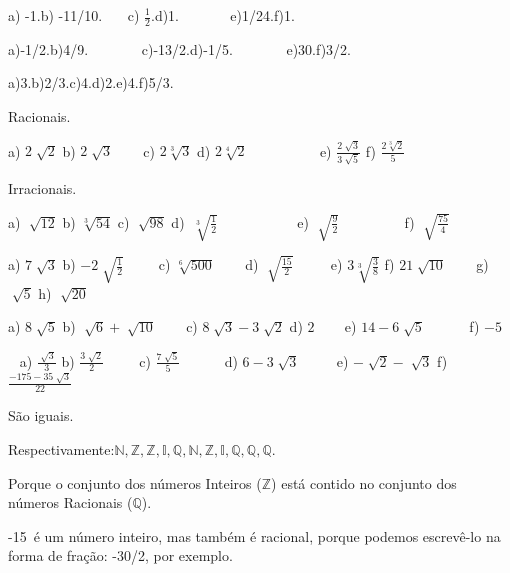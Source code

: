\begin{respostas}{4}
	\ansitem{} a) -1.\quad b) -11/10.~~~ \quad c) $\frac{1}{2}$.\quad  d)1. ~~~~~~ e)1/24.\quad f)1.

	\ansitem{} a)-1/2.\quad b)4/9.~~~~~~~ c)-13/2.\quad d)-1/5.~~~~~~~ e)30.\quad f)3/2.
\end{respostas}

\begin{respostas}{5}
	\ansitem{} a)3.\quad b)2/3.\quad \quad c)4.\quad d)2.\quad e)4.\quad f)5/3.

	\ansitem{}  Racionais.

	\ansitem{} a)  \( 2\sqrt[]{2} \) \quad b)  \( 2\sqrt[]{3} \) ~~~ \quad c)  \( 2\sqrt[3]{3} \) \quad \quad d)  \( 2\sqrt[4]{2} \) ~~~~~~~~~ e)  \( \frac{2\sqrt[]{3}}{3\sqrt[]{5}} \) \quad \quad f)  \( \frac{2\sqrt[3]{2}}{5} \) 

	\ansitem{}  Irracionais. 

	\ansitem{}  a)  \( \sqrt[]{12} \) \quad b)  \( \sqrt[3]{54} \) \quad \quad c)  \( \sqrt[]{98} \) \quad \quad d) \( ~\sqrt[3]{\frac{1}{2}} \) ~~~~~~~~~~ e)  \( \sqrt[]{\frac{9}{2}} \) ~~~~~~~~ f)  \( \sqrt[]{\frac{75}{4}} \) 

	\ansitem{} a)  \( 7\sqrt[]{3} \) \quad b)  \( -2\sqrt[]{\frac{1}{2}} \)  ~ ~~ c)  \( \sqrt[6]{500} \) \quad ~~~ d)  \( \sqrt[]{\frac{15}{2}} \) ~~~~ e)  \( 3\sqrt[3]{\frac{3}{8}} \) \quad f)  \( 21\sqrt[]{10} \) ~~~ g)  \( \sqrt[]{5} \) \quad h)  \( \sqrt[]{20} \) 

	\ansitem{}  a)  \( 8\sqrt[]{5} \) \quad b)  \( \sqrt[]{6}+\sqrt[]{10} \) ~~~  c)  \( 8\sqrt[]{3}-3\sqrt[]{2} \) \quad d)  \( 2 \) ~~~ \quad  e)  \( 14-6\sqrt[]{5} \) \quad ~~~~~ f)  \( -5 \) 

	\ansitem{} ~ a)  \( \frac{\sqrt[]{3}}{3} \) \quad b)  \( \frac{3\sqrt[]{2}}{2} \) ~~ ~ c)  \( \frac{7\sqrt[]{5}}{5} \) ~~~~~ d)  \( 6-3\sqrt[]{3} \) ~~~~ e)  \( -\sqrt[]{2}-\sqrt[]{3} \) \quad f)  \( \frac{-175-35\sqrt[]{3}}{22} \) 

	\ansitem{}São iguais.

	\ansitem{} Respectivamente:$\mathbb{N}, \mathbb{Z}, \mathbb{Z}, \mathbb{I}, \mathbb{Q}, \mathbb{N}, \mathbb{Z}, \mathbb{I}, \mathbb{Q}, \mathbb{Q}, \mathbb{Q}$.

	\ansitem{} Porque o conjunto dos números Inteiros ($\mathbb{Z}$) está contido no conjunto dos números Racionais ($\mathbb{Q}$).

	\ansitem{}  -15~é um número inteiro, mas também é racional, porque podemos escrevê-lo  na forma de fração: -30/2, por exemplo.


\end{respostas}
